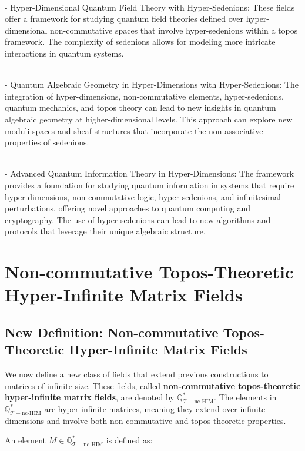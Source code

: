 \documentclass{article}
\begin{document}
{\ }\\
- Hyper-Dimensional Quantum Field Theory with Hyper-Sedenions: These fields offer a framework for studying quantum field theories defined over hyper-dimensional non-commutative spaces that involve hyper-sedenions within a topos framework. The complexity of sedenions allows for modeling more intricate interactions in quantum systems.

{\ }\\
- Quantum Algebraic Geometry in Hyper-Dimensions with Hyper-Sedenions: The integration of hyper-dimensions, non-commutative elements, hyper-sedenions, quantum mechanics, and topos theory can lead to new insights in quantum algebraic geometry at higher-dimensional levels. This approach can explore new moduli spaces and sheaf structures that incorporate the non-associative properties of sedenions.

{\ }\\
- Advanced Quantum Information Theory in Hyper-Dimensions: The framework provides a foundation for studying quantum information in systems that require hyper-dimensions, non-commutative logic, hyper-sedenions, and infinitesimal perturbations, offering novel approaches to quantum computing and cryptography. The use of hyper-sedenions can lead to new algorithms and protocols that leverage their unique algebraic structure.



\section{Non-commutative Topos-Theoretic Hyper-Infinite Matrix Fields}
\subsection{New Definition: Non-commutative Topos-Theoretic Hyper-Infinite Matrix Fields}
We now define a new class of fields that extend previous constructions to matrices of infinite size. These fields, called \textbf{non-commutative topos-theoretic hyper-infinite matrix fields}, are denoted by \(\mathbb{Q}_{\mathcal{T}-\text{nc-HIM}}^*\). The elements in \(\mathbb{Q}_{\mathcal{T}-\text{nc-HIM}}^*\) are hyper-infinite matrices, meaning they extend over infinite dimensions and involve both non-commutative and topos-theoretic properties.

An element \(M \in \mathbb{Q}_{\mathcal{T}-\text{nc-HIM}}^*\) is defined as:
\end{document}
